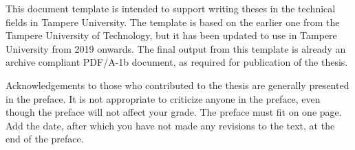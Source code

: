 This document template is intended to support writing theses in the technical fields in Tampere University. The template is based on the earlier one from the Tampere University of Technology, but it has been updated to use in Tampere University from 2019 onwards. The final output from this template is already an archive compliant PDF/A-1b document, as required for publication of the thesis.

Acknowledgements to those who contributed to the thesis are generally presented in the preface. It is not appropriate to criticize anyone in the preface, even though the preface will not affect your grade. The preface must fit on one page. Add the date, after which you have not made any revisions to the text, at the end of the preface.